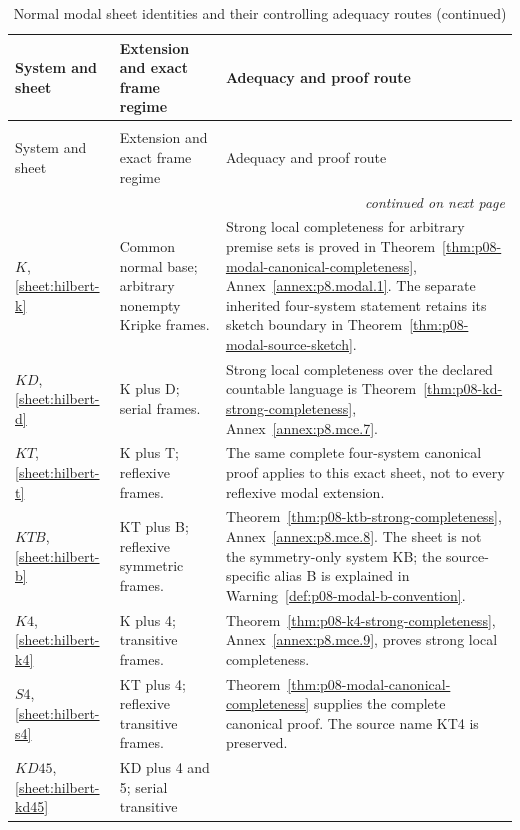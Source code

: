 \begingroup\small
\begin{longtable}{@{}p{.16\linewidth}p{.29\linewidth}p{.47\linewidth}@{}}
\caption{Normal modal sheet identities and their controlling adequacy routes.}
\label{tab:p14-nonclassical-normal-modal}\\
\toprule
System and sheet & Extension and exact frame regime & Adequacy and proof route \\
\midrule\endfirsthead
\caption[]{Normal modal sheet identities and their controlling adequacy routes (continued)}\\
\toprule System and sheet & Extension and exact frame regime & Adequacy and proof route \\
\midrule\endhead
\midrule\multicolumn{3}{r}{\emph{continued on next page}}\\
\endfoot
\endlastfoot
\(K\), \ref{sheet:hilbert-k} & Common normal base; arbitrary nonempty
Kripke frames. & Strong local completeness for arbitrary premise sets is
proved in Theorem~\ref{thm:p08-modal-canonical-completeness},
Annex~\ref{annex:p8.modal.1}. The separate inherited four-system statement
retains its sketch boundary in Theorem~\ref{thm:p08-modal-source-sketch}. \\
\addlinespace
\(KD\), \ref{sheet:hilbert-d} & K plus D; serial frames. & Strong local
completeness over the declared countable language is
Theorem~\ref{thm:p08-kd-strong-completeness},
Annex~\ref{annex:p8.mce.7}. \\
\addlinespace
\(KT\), \ref{sheet:hilbert-t} & K plus T; reflexive frames. & The same
complete four-system canonical proof applies to this exact sheet, not to
every reflexive modal extension. \\
\addlinespace
\(KTB\), \ref{sheet:hilbert-b} & KT plus B; reflexive symmetric frames. &
Theorem~\ref{thm:p08-ktb-strong-completeness},
Annex~\ref{annex:p8.mce.8}. The sheet is not the symmetry-only system KB;
the source-specific alias B is explained in
Warning~\ref{def:p08-modal-b-convention}. \\
\addlinespace
\(K4\), \ref{sheet:hilbert-k4} & K plus 4; transitive frames. &
Theorem~\ref{thm:p08-k4-strong-completeness},
Annex~\ref{annex:p8.mce.9}, proves strong local completeness. \\
\addlinespace
\(S4\), \ref{sheet:hilbert-s4} & KT plus 4; reflexive transitive frames. &
Theorem~\ref{thm:p08-modal-canonical-completeness} supplies the complete
canonical proof. The source name KT4 is preserved. \\
\addlinespace
\(KD45\), \ref{sheet:hilbert-kd45} & KD plus 4 and 5; serial transitive

\end{longtable}
